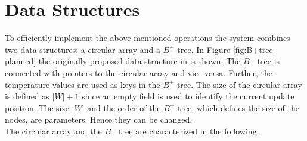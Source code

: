 \documentclass[abstracton,12pt]{scrreprt}
\begin{document}
\section{Data Structures}
\label{sec:das}
To efficiently implement the above mentioned operations the system combines two data structures:
a circular array and a $B^+$ tree. In Figure \ref{fig:B+tree planned} the originally proposed data structure in \cite{BScT} is shown. The $B^+$ tree is connected with pointers to the circular array and vice versa. Further, the temperature values are used as keys in the $B^+$ tree. The size of the circular array is defined as $|W| + 1$ since an empty field is used to identify the current update position. The size $|W|$ and the order of the $B^+$ tree, which defines the size of the nodes, are parameters. Hence they can be changed.\\The circular array and the $B^+$ tree are characterized in the following. 
\end{document}
